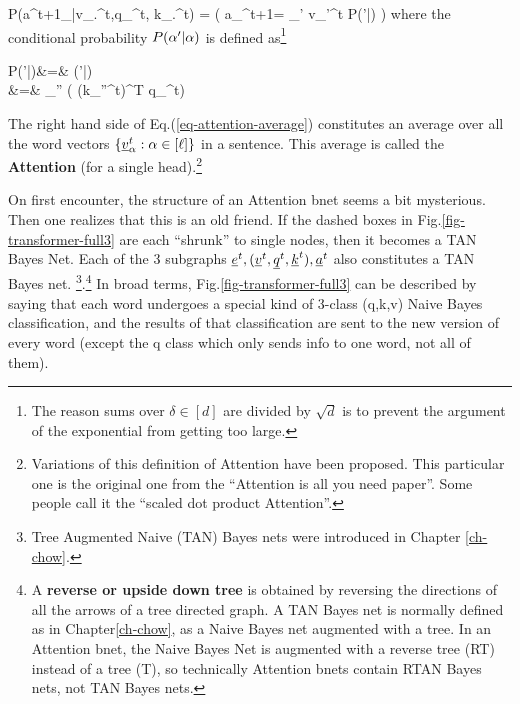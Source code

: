 \beq\color{blue}
P(a^{t+1}_\alp|v_.^t,q_\alp^t,
 k_.^t)
=
\indi(\;\;\;
a_\alp^{t+1}=
\sum_{{\alp'}\in[\ell]}
v_{\alp'}^t
P({\alp'}|\alp)
\;\;)
\label{eq-attention-average}
\eeq
where the conditional
probability 
$P({\alpha'}|\alpha)$ is 
defined as\footnote{
The reason sums over 
$\delta\in[d]$ are divided by
$\sqrt{d}$ is to 
prevent the argument of
the exponential from getting too
large.
}

\beqa
P({\alp'}|\alp)&=&
\softmax{}(\alp'|\alp)
\\
&=&
{\sum_{\alp''\in [\ell]}
\exp\left(
(k_{\alp''}^t)^T q_\alp^t\right)}
\eeqa

The right hand side of Eq.(\ref{eq-attention-average})
constitutes an average over 
all the word vectors $\{{\underline{v}}_\alpha^t: \alpha\in[\ell]\}$
in a sentence.
This average is called the {\bf Attention}
(for a single head).\footnote{Variations
of this definition of Attention
have been proposed. This particular one
is the original
one from the \enquote{Attention is all
you need paper}. Some people
call it the \enquote{scaled dot product Attention}.}

\beq
{}
\eeq



On first encounter, the structure of an Attention bnet
seems a bit mysterious. Then one realizes that this is
an old friend. 
If the dashed  boxes in 
Fig.\ref{fig-transformer-full3} are each \enquote{shrunk} to single nodes,
then it becomes a TAN Bayes Net. Each of the 3 subgraphs ${\underline{e}}^t, ({\underline{v}}^t, {\underline{q}}^t, {\underline{k}}^t), {\underline{a}}^t $
also constitutes a TAN Bayes net. \footnote{Tree Augmented Naive (TAN) Bayes nets
were introduced in Chapter \ref{ch-chow}.}.\footnote{A {\bf reverse or upside down tree} is obtained by reversing the directions of all the arrows of a tree directed graph. A TAN Bayes net is normally defined as in Chapter\ref{ch-chow}, as a Naive Bayes net augmented with a tree. In an Attention bnet, the Naive Bayes Net is augmented with a reverse tree (RT) instead of a tree (T), so technically Attention bnets contain RTAN Bayes nets, not TAN Bayes nets. }
In broad terms, Fig.\ref{fig-transformer-full3}
can be described by saying that
each word undergoes a special
kind of 3-class (q,k,v) Naive Bayes
classification,
and the results of that classification
are sent to the new version of every word (except the q class which only sends
info to one word, not all of them).

